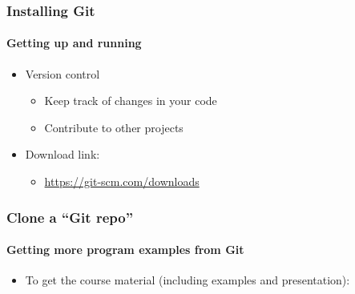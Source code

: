 \documentclass{beamer}
\begin{document}
    \begin{frame}
	    \frametitle{Installing Git}
	    \framesubtitle{Getting up and running}

	    \begin{itemize}
		    \item Version control
			    \begin{itemize}
				    \item Keep track of changes in your code
				    \item Contribute to other projects
			    \end{itemize}
		    \item Download link:
			    \begin{itemize}
				    \item \url{https://git-scm.com/downloads}
			    \end{itemize}
	    \end{itemize}
    \end{frame}



    \begin{frame}
	    \frametitle{Clone a ``Git repo''}
	    \framesubtitle{Getting more program examples from Git}

	    \begin{itemize}
		    \item To get the course material (including examples and presentation):
	    \end{itemize}
	    \lstF
    \end{frame}

%
\end{document}
